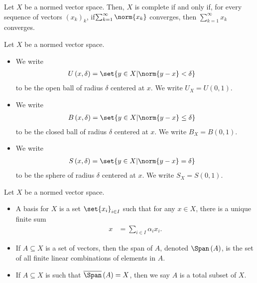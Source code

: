 \begin{theorem}
  Let $X$ be a normed vector space. Then, $X$ is complete if and only if, for every sequence of vectors $\left(x_k\right)_k$, if$\sum_{k=1}^{\infty}\norm{x_k}$ converges, then $\sum_{k=1}^{\infty}x_k$ converges.
\end{theorem}
\begin{definition}\label{def:open_closed_balls}
  Let $X$ be a normed vector space.
  \begin{itemize}
    \item We write 
      \begin{align*}
        U\left(x,\delta\right) &= \set{y\in X | \norm{y-x} < \delta}
      \end{align*}
      to be the open ball of radius $\delta$ centered at $x$. We write $U_X = U\left(0,1\right)$.
    \item We write
      \begin{align*}
        B\left(x,\delta\right) &= \set{y\in X | \norm{y-x} \leq \delta}
      \end{align*}
      to be the closed ball of radius $\delta$ centered at $x$. We write $B_X = B\left(0,1\right)$.
    \item We write
      \begin{align*}
        S\left(x,\delta\right) &= \set{y\in X | \norm{y-x} = \delta}
      \end{align*}
      to be the sphere of radius $\delta$ centered at $x$. We write $S_X = S\left(0,1\right)$.
  \end{itemize}
\end{definition}
\begin{definition}\label{def:basis}
  Let $X$ be a normed vector space.
  \begin{itemize}
    \item A basis for $X$ is a set $\set{x_i}_{i\in I}$ such that for any $x\in X$, there is a unique finite sum
      \begin{align*}
        x &= \sum_{i\in I}\alpha_i x_i.
      \end{align*}
    \item If $A\subseteq X$ is a set of vectors, then the span of $A$, denoted $\Span\left(A\right)$, is the set of all finite linear combinations of elements in $A$.
    \item If $A\subseteq X$ is such that $\overline{\Span}\left(A\right) = X$, then we say $A$ is a total subset of $X$.
  \end{itemize}
\end{definition}
